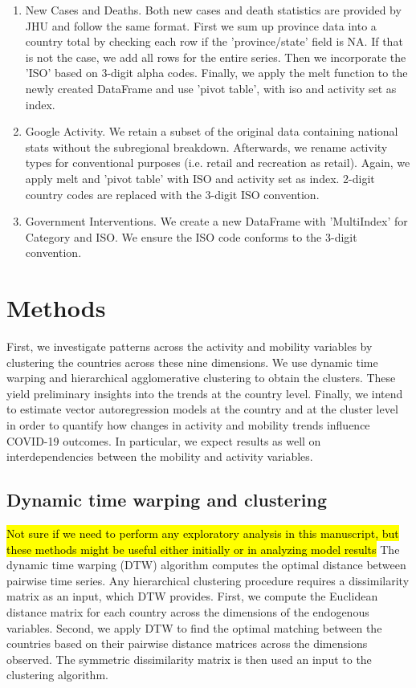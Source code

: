 \documentclass[preprint, 12pt]{elsarticle}
\newcommand{\?}{\stackrel{?}{=}}
\begin{document}
  \begin{enumerate}
  \item New Cases and Deaths.
   Both new cases and death statistics are provided by JHU and follow the same format. First we sum up province data into a country total by checking each row if the 'province/state' field is NA.
   If that is not the case, we add all rows for the entire series. Then we incorporate the 'ISO' based on 3-digit alpha codes. Finally, we apply the melt function to the newly created DataFrame
   and use 'pivot table', with iso and activity set as index.
  \item Google Activity.
   We retain a subset of the original data containing national stats without the subregional breakdown. Afterwards, we rename activity types for conventional purposes (i.e. retail and recreation  as retail). Again, we apply melt and 'pivot table' with ISO and activity set as index. 2-digit country codes are replaced with the 3-digit ISO convention.
  \item Government Interventions.
  We create a new DataFrame with 'MultiIndex' for Category and ISO. We ensure the ISO code conforms to the 3-digit convention.
  \end{enumerate}


\section{Methods}
First, we investigate patterns across the activity and mobility variables by clustering the countries across these nine dimensions.
We use dynamic time warping and hierarchical agglomerative clustering to obtain the clusters.
These yield preliminary insights into the trends at the country level.
Finally, we intend to estimate vector autoregression models at the country and at the cluster level in order to quantify how changes in activity and mobility trends influence COVID-19 outcomes. 
In particular, we expect results as well on interdependencies between the mobility and activity variables.


\subsection{Dynamic time warping and clustering}
\hl{Not sure if we need to perform any exploratory analysis in this manuscript, but these methods might be useful either initially or in analyzing model results}
The dynamic time warping (DTW) algorithm \cite{giorgino2009computing} computes the optimal distance between pairwise time series.
Any hierarchical clustering procedure requires a dissimilarity matrix as an input, which DTW provides.
First, we compute the Euclidean distance matrix for each country across the dimensions of the endogenous variables.
Second, we apply DTW to find the optimal matching between the countries based on their pairwise distance matrices across the dimensions observed.
The symmetric dissimilarity matrix is then used an input to the clustering algorithm.
\end{document}
